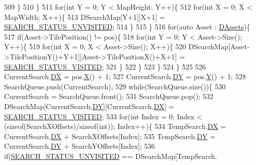 \begin{DoxyCode}
509         \}
510     \}
511     \textcolor{keywordflow}{for}(\textcolor{keywordtype}{int} Y = 0; Y < MapHeight; Y++)\{
512         \textcolor{keywordflow}{for}(\textcolor{keywordtype}{int} X = 0; X < MapWidth; X++)\{
513             DSearchMap[Y+1][X+1] = \hyperlink{AssetDecoratedMap_8cpp_a59f1c84b6a309e92137f4cc017de2f52}{SEARCH\_STATUS\_UNVISITED};
514         \}
515     \}
516     \textcolor{keywordflow}{for}(\textcolor{keyword}{auto} Asset : \hyperlink{classCAssetDecoratedMap_a94eeed5b16141169b1ba6cb3842055aa}{DAssets})\{
517         \textcolor{keywordflow}{if}(Asset->TilePosition() != pos)\{
518             \textcolor{keywordflow}{for}(\textcolor{keywordtype}{int} Y = 0; Y < Asset->Size(); Y++)\{
519                 \textcolor{keywordflow}{for}(\textcolor{keywordtype}{int} X = 0; X < Asset->Size(); X++)\{
520                     DSearchMap[Asset->TilePositionY()+Y+1][Asset->TilePositionX()+X+1] = 
      \hyperlink{AssetDecoratedMap_8cpp_ae8b1ae5dd44be7811fb48e54c1194503}{SEARCH\_STATUS\_VISITED};
521                 \}
522             \}     
523         \}
524     \}
525     
526     CurrentSearch.\hyperlink{structSSearchTile_a08045e94e80c5c6e98f23313139853c6}{DX} = pos.\hyperlink{classCPosition_a9a6b94d3b91df1492d166d9964c865fc}{X}() + 1;
527     CurrentSearch.\hyperlink{structSSearchTile_a5a7b0a0b5d8efc7a01175625a012abd1}{DY} = pos.\hyperlink{classCPosition_a1aa8a30e2f08dda1f797736ba8c13a87}{Y}() + 1;
528     SearchQueue.push(CurrentSearch);
529     \textcolor{keywordflow}{while}(SearchQueue.size())\{
530         CurrentSearch = SearchQueue.front();
531         SearchQueue.pop();
532         DSearchMap[CurrentSearch.\hyperlink{structSSearchTile_a5a7b0a0b5d8efc7a01175625a012abd1}{DY}][CurrentSearch.\hyperlink{structSSearchTile_a08045e94e80c5c6e98f23313139853c6}{DX}] = 
      \hyperlink{AssetDecoratedMap_8cpp_ae8b1ae5dd44be7811fb48e54c1194503}{SEARCH\_STATUS\_VISITED};
533         \textcolor{keywordflow}{for}(\textcolor{keywordtype}{int} Index = 0; Index < (\textcolor{keyword}{sizeof}(SearchXOffsets)/\textcolor{keyword}{sizeof}(\textcolor{keywordtype}{int})); Index++)\{
534             TempSearch.\hyperlink{structSSearchTile_a08045e94e80c5c6e98f23313139853c6}{DX} = CurrentSearch.\hyperlink{structSSearchTile_a08045e94e80c5c6e98f23313139853c6}{DX} + SearchXOffsets[Index];
535             TempSearch.\hyperlink{structSSearchTile_a5a7b0a0b5d8efc7a01175625a012abd1}{DY} = CurrentSearch.\hyperlink{structSSearchTile_a5a7b0a0b5d8efc7a01175625a012abd1}{DY} + SearchYOffsets[Index];
536             \textcolor{keywordflow}{if}(\hyperlink{AssetDecoratedMap_8cpp_a59f1c84b6a309e92137f4cc017de2f52}{SEARCH\_STATUS\_UNVISITED} == DSearchMap[TempSearch.

\end{DoxyCode}
